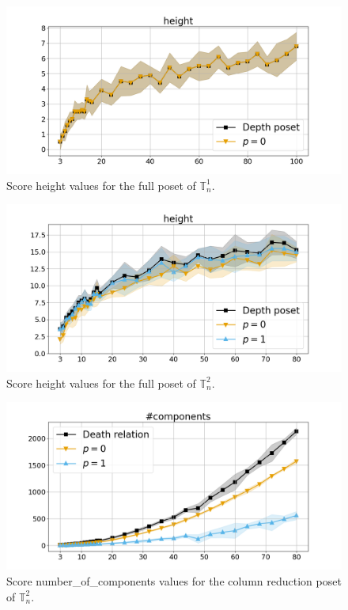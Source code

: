 \documentclass{article}
\begin{document}
    \begin{figure}[h!]
        \centering
        \hspace*{-0.24\textwidth}
        \includegraphics[width=1.4\textwidth]{pics/extended torus scores/score=height, dim=1, object=full.png}
        \caption{Score height values for the full poset of $\mathbb{T}_n^{1}$.}
        \label{fig:height-full1}
    \end{figure}
    \begin{figure}[h!]
        \centering
        \hspace*{-0.24\textwidth}
        \includegraphics[width=1.4\textwidth]{pics/extended torus scores/score=height, dim=2, object=full.png}
        \caption{Score height values for the full poset of $\mathbb{T}_n^{2}$.}
        \label{fig:height-full2}
    \end{figure}
    \begin{figure}[h!]
        \centering
        \hspace*{-0.24\textwidth}
        \includegraphics[width=1.4\textwidth]{pics/extended torus scores/score=number-of-components, dim=2, object=column reduction.png}
        \caption{Score number\_of\_components values for the column reduction poset of $\mathbb{T}_n^{2}$.}
        \label{fig:numberofcomponents-columnreduction2}
    \end{figure}
\end{document}
